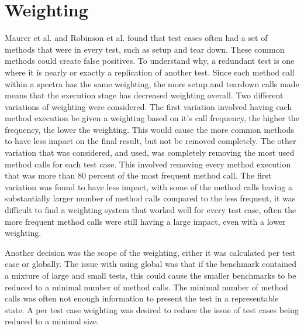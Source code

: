 \section{Weighting}
Maurer et al. \cite{koochakzadeh2009test} and Robinson et al. \cite{li2008static} found that test cases often had a set of methods that were in every test, such as setup and tear down. These common methods could create false positives. To understand why, a redundant test is one where it is nearly or exactly a replication of another test. Since each method call within a spectra has the same weighting, the more setup and teardown calls made means that the execution stage has decreased weighting overall. Two different variations of weighting were considered. The first variation involved having each method execution be given a weighting based on it's call frequency, the higher the frequency, the lower the weighting. This would cause the more common methods to have less impact on the final result, but not be removed completely. The other variation that was considered, and used, was completely removing the most used method calls for each test case. This involved removing every method execution that was more than 80 percent of the most frequent method call. The first variation was found to have less impact, with some of the method calls having a substantially larger number of method calls compared to the less frequent, it was difficult to find a weighting system that worked well for every test case, often the more frequent method calls were still having a large impact, even with a lower weighting.

Another decision was the scope of the weighting, either it was calculated per test case or globally. The issue with using global was that if the benchmark contained a mixture of large and small tests, this could cause the smaller benchmarks to be reduced to a minimal number of method calls. The minimal number of method calls was often not enough information to present the test in a representable state. A per test case weighting was desired to reduce the issue of test cases being reduced to a minimal size.
